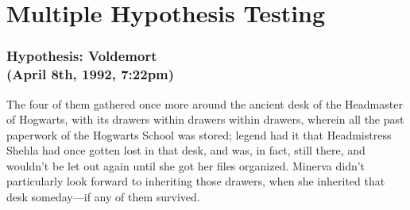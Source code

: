 \chapter{Multiple Hypothesis Testing}

\begin{headlines}


\label{Toronto Magical Tribune:}




\label{New Zealand Spellcrafter's Diurnal Notice:}



\label{American Mage:}


\label{The Quibbler:}


\label{Daily Prophet:}

\end{headlines}
\sbreakit
\subsection{Hypothesis: Voldemort\\
(April 8th, 1992, 7:22pm)}

The four of them gathered once more around the ancient desk of the Headmaster 
of Hogwarts, with its drawers within drawers within drawers, wherein all the 
past paperwork of the Hogwarts School was stored; legend had it that 
Headmistress Shehla had once gotten lost in that desk, and was, in fact, still 
there, and wouldn't be let out again until she got her files organized. Minerva 
didn't particularly look forward to inheriting those drawers, when she 
inherited that desk someday---if any of them survived.

